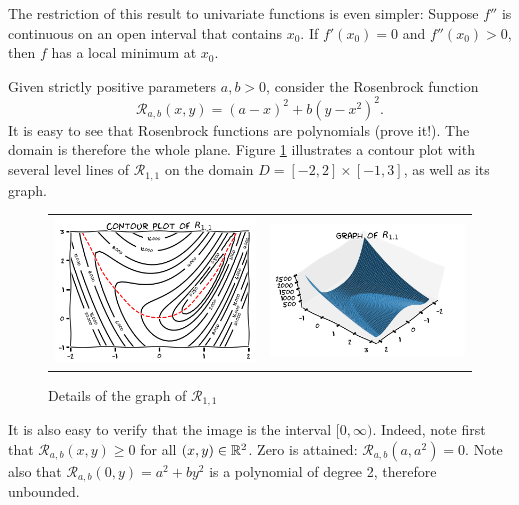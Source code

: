 \begin{remark}
The restriction of this result to univariate functions is even simpler: Suppose $f''$ is continuous on an open interval that contains $x_0$.  If $f'(x_0)=0$ and $f''(x_0)>0$, then $f$ has a local minimum at $x_0$. 
\end{remark}

\begin{example}\label{example:Rosenbrock}
Given strictly positive parameters $a,b > 0$, consider the Rosenbrock function 
\begin{equation*} 
\mathcal{R}_{a,b}(x, y) = (a-x)^2 + b(y-x^2)^2.
\end{equation*}
It is easy to see that Rosenbrock functions are polynomials (prove it!).  The domain is therefore the whole plane. Figure \ref{figure:Rosenbrock} illustrates a contour plot with several level lines of $\mathcal{R}_{1,1}$ on the domain $D = [-2,2] \times [-1,3]$, as well as its graph.

\begin{figure}[ht!]
\begin{tabular}{cc}
\includegraphics[width=0.5\linewidth]{rosenbrockContour} &
\includegraphics[width=0.5\linewidth]{rosenbrockGraph}
\end{tabular}
\caption{Details of the graph of $\mathcal{R}_{1,1}$}
\label{figure:Rosenbrock}
\end{figure}
It is also easy to verify that the image is the interval $[0,\infty)$.  Indeed, note first that $\mathcal{R}_{a,b}(x,y) \geq 0$ for all $(x,y) \in \mathbb{R}^2$.  Zero is attained: $\mathcal{R}_{a,b} (a,a^2) = 0$.  Note also that $\mathcal{R}_{a,b}(0,y) = a^2 + by^2$ is a polynomial of degree 2, therefore unbounded.


\end{example}
